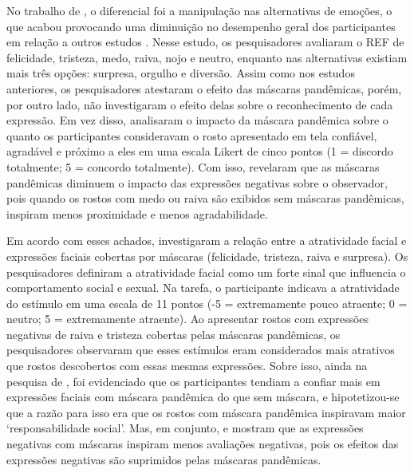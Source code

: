 \documentclass[portuguese]{textolivre}
\begin{document}
No trabalho de \textcite{grundmann_face_2020}, o diferencial foi a manipulação nas alternativas de emoções, o que acabou provocando uma diminuição no desempenho geral dos participantes em relação a outros estudos \cite{carbon_wearing_2020, carbon_impact_2021}. Nesse estudo, os pesquisadores avaliaram o REF de felicidade, tristeza, medo, raiva, nojo e neutro, enquanto nas alternativas existiam mais três opções: surpresa, orgulho e diversão. Assim como nos estudos anteriores, os pesquisadores atestaram o efeito das máscaras pandêmicas, porém, por outro lado, não investigaram o efeito delas sobre o reconhecimento de cada expressão. Em vez disso, analisaram o impacto da máscara pandêmica sobre o quanto os participantes consideravam o rosto apresentado em tela confiável, agradável e próximo a eles em uma escala Likert de cinco pontos (1 = discordo totalmente;  5 = concordo totalmente). Com isso, revelaram que as máscaras pandêmicas diminuem o impacto das expressões negativas sobre o observador, pois quando os rostos com medo ou raiva são exibidos sem máscaras pandêmicas, inspiram menos proximidade e menos agradabilidade. 


Em acordo com esses achados, \textcite{parada-fernandez_wearing_2022} investigaram a relação entre a atratividade facial e expressões faciais cobertas por máscaras (felicidade, tristeza, raiva e surpresa). Os pesquisadores definiram a atratividade facial como um forte sinal que influencia o comportamento social e sexual. Na tarefa, o participante indicava a atratividade do estímulo em uma escala de 11 pontos (-5 = extremamente pouco atraente; 0 = neutro; 5 = extremamente atraente). Ao apresentar rostos com expressões negativas de raiva e tristeza cobertas pelas máscaras pandêmicas, os pesquisadores observaram que esses estímulos eram considerados mais atrativos que rostos descobertos com essas mesmas expressões. Sobre isso, ainda na pesquisa de \textcite{carbon_wearing_2020}, foi evidenciado que os participantes tendiam a confiar mais em expressões faciais com máscara pandêmica do que sem máscara, e hipotetizou-se que a razão para isso era que os rostos com máscara pandêmica inspiravam maior ‘responsabilidade social’. Mas, em conjunto, \textcite{grundmann_face_2020} e \textcite{parada-fernandez_wearing_2022} mostram que as expressões negativas com máscaras inspiram menos avaliações negativas, pois os efeitos das expressões negativas são suprimidos pelas máscaras pandêmicas.
\end{document}
